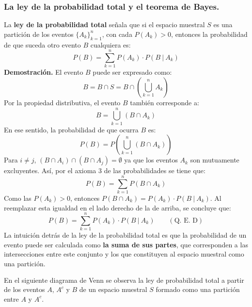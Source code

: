 \documentclass[12pt]{article}
\begin{document}
\subsubsection{La ley de la probabilidad total y el teorema de Bayes.}

La \textbf{ley de la probabilidad total} señala que si el espacio muestral $S$ es una partición de los eventos $\{A_{k}\}_{k = 1}^{n}$, con cada $P(A_{k}) > 0$, entonces la probabilidad de que suceda otro evento $B$ cualquiera es:
\[
  P(B) = \sum_{k = 1}^{n} P(A_{k}) \cdot P(B \ | \ A_{k})
\]
\textbf{Demostración.} El evento $B$ puede ser expresado como:
\[
  B = B \cap S = B \cap \left(\bigcup_{k = 1}^{n} A_{k}\right)
\]
Por la propiedad distributiva, el evento $B$ también corresponde a:
\[
  B = \bigcup_{k = 1}^{n} (B \cap A_{k})
\]
En ese sentido, la probabilidad de que ocurra $B$ es:
\[
  P(B) = P\left(\bigcup_{k = 1}^{n} (B \cap A_{k})\right)
\]
Para $i \neq j$, $(B \cap A_{i}) \cap (B \cap A_{j}) = \emptyset$ ya que los eventos $A_{k}$ son mutuamente excluyentes. Así, por el axioma 3 de las probabilidades se tiene que:
\[
  P(B) = \sum_{k = 1}^{n} P(B \cap A_{k})
\]
Como las $P(A_{k}) > 0$, entonces $P(B \cap A_{k}) = P(A_{k}) \cdot P(B \ | \ A_{k})$. Al reemplazar esta igualdad en el lado derecho de la de arriba, se concluye que:
\[
  P(B) = \sum_{k = 1}^{n} P(A_{k}) \cdot P(B \ | \ A_{k}) \qquad (\text{Q. E. D})
\]
La intuición detrás de la ley de la probabilidad total es que la probabilidad de un evento puede ser calculada como \textbf{la suma de sus partes}, que corresponden a las intersecciones entre este conjunto y los que constituyen al espacio muestral como una partición.

En el siguiente diagrama de Venn se observa la ley de probabilidad total a partir de los eventos $A$, $A^{c}$ y $B$ de un espacio muestral $S$ formado como una partición entre $A$ y $A^{c}$.

\begin{figure}[hbt!]

\centering


\end{figure}
\end{document}
